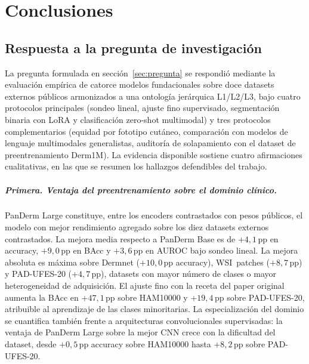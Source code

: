 
\chapter{Conclusiones}
\label{cap:conclusiones}

\section{Respuesta a la pregunta de investigación}
\label{sec:respuesta}

La pregunta formulada en secci\'on~\ref{sec:pregunta} se respondió mediante
la evaluación empírica de catorce modelos fundacionales sobre doce
datasets externos públicos armonizados a una ontología jerárquica
L1/L2/L3, bajo cuatro protocolos principales (sondeo lineal,
ajuste fino supervisado, segmentación binaria con LoRA y
clasificación zero-shot multimodal) y tres protocolos
complementarios (equidad por fototipo cutáneo, comparación con
modelos de lenguaje multimodales generalistas, auditoría de
solapamiento con el dataset de preentrenamiento Derm1M). La
evidencia disponible sostiene cuatro afirmaciones cualitativas, en
las que se resumen los hallazgos defendibles del trabajo.

\paragraph{Primera. Ventaja del preentrenamiento sobre el dominio
clínico.}
PanDerm Large constituye, entre los encoders contrastados con
pesos públicos, el modelo con mejor rendimiento agregado sobre los
diez datasets externos contrastados. La mejora media respecto a
PanDerm Base es de $+4{,}1$\,pp en accuracy, $+9{,}0$\,pp en
BAcc y $+3{,}6$\,pp en AUROC bajo sondeo lineal. La mejora
absoluta es máxima sobre Dermnet ($+10{,}0$\,pp accuracy),
WSI~patches ($+8{,}7$\,pp) y PAD-UFES-20 ($+4{,}7$\,pp),
datasets con mayor número de clases o mayor heterogeneidad de
adquisición. El ajuste fino con la receta del paper original
aumenta la BAcc en $+47{,}1$\,pp sobre HAM10000 y
$+19{,}4$\,pp sobre PAD-UFES-20, atribuible al aprendizaje de las
clases minoritarias. La especialización del dominio se cuantifica
también frente a arquitecturas convolucionales supervisadas: la
ventaja de PanDerm Large sobre la mejor CNN crece con la dificultad
del dataset, desde $+0{,}5$\,pp accuracy sobre HAM10000 hasta
$+8{,}2$\,pp sobre PAD-UFES-20.

